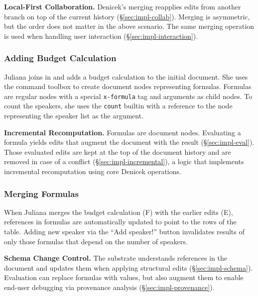 \documentclass[sigconf]{acmart}
\newcommand{\diff}[1]{{#1}}
\newcommand{\note}[1]{}
\newcommand*\circled[1]{\textnormal{\footnotesize\sffamily\bfseries\protect\tikz[baseline=(char.base)]{
  \node[shape=circle,fill=black,text=white,draw,inner sep=1pt] (char) {#1};}}}
\DeclareRobustCommand{\keyideabox}[3]
{\vspace{\dimexpr\baselineskip\relax} \noindent\colorbox{gray!20}{
\parbox{\dimexpr\columnwidth-\marginparsep+1pt\relax}
{\small {#1} \textbf{#2.} #3}
}}
\begin{document}
\keyideabox{\faLightbulbO}{Local-First Collaboration}{Denicek's merging
reapplies edits from another branch on top of the current history (\S\ref{sec:impl-collab}).
Merging is asymmetric, but the order does not matter in the above scenario. The same merging
operation is used when handling user interaction (\S\ref{sec:impl-interaction}).}

\subsubsection*{\circled{F} Adding Budget Calculation} Juliana joins in and adds a budget calculation to
the initial document. \diff{She uses the command toolbox to create document nodes representing
formulas. Formulas are regular nodes with a special} {\small\texttt{x-formula}} \diff{tag and
arguments as child nodes. To count the speakers, she uses the} {\small\texttt{count}} \diff{builtin
with a reference to the node representing the speaker list as the argument.}\note{Modified to describe
representation of formulas.}

\keyideabox{\faLightbulbO}{Incremental Recomputation}{Formulas are document nodes.
Evaluating a formula yields edits that augment the document with the result
(\S\ref{sec:impl-eval}). Those evaluated edits are kept at the top of the document history and are
removed in case of a conflict (\S\ref{sec:impl-incremental}), a logic that implements
incremental recomputation using core Denicek operations.}

\subsubsection*{\circled{G} Merging Formulas} When Juliana merges the budget calculation (F) with
the earlier edits (E), references in formulas are automatically updated to point to the \diff{rows of the table}.
Adding new speaker via the ``Add speaker!'' button \diff{invalidates results of only those formulas
that depend on the number of speakers.}

\keyideabox{\faLightbulbO}{Schema Change Control}{The substrate understands references in
the document and updates them when applying structural edits (\S\ref{sec:impl-schema}).
Evaluation can replace formulas with values, but also augment them to enable
end-user debugging via provenance analysis (\S\ref{sec:impl-provenance}).}

\end{document}
